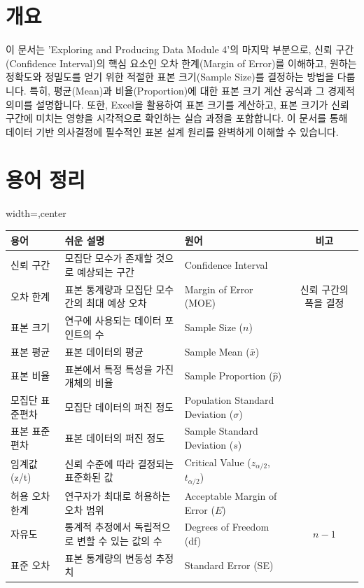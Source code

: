 \documentclass[11pt,a4paper]{book}
\theoremstyle{definition}
\begin{document}
\begin{enumerate}
\begin{enumerate}
\section{개요}
이 문서는 'Exploring and Producing Data Module 4'의 마지막 부분으로, 신뢰 구간(Confidence Interval)의 핵심 요소인 오차 한계(Margin of Error)를 이해하고, 원하는 정확도와 정밀도를 얻기 위한 적절한 표본 크기(Sample Size)를 결정하는 방법을 다룹니다. 특히, 평균(Mean)과 비율(Proportion)에 대한 표본 크기 계산 공식과 그 경제적 의미를 설명합니다. 또한, Excel을 활용하여 표본 크기를 계산하고, 표본 크기가 신뢰 구간에 미치는 영향을 시각적으로 확인하는 실습 과정을 포함합니다. 이 문서를 통해 데이터 기반 의사결정에 필수적인 표본 설계 원리를 완벽하게 이해할 수 있습니다.


\section{용어 정리}

\begin{adjustbox}{width=\textwidth,center}
\begin{tabular}{lllc}
\toprule
\textbf{용어} & \textbf{쉬운 설명} & \textbf{원어} & \textbf{비고} \\
\midrule
신뢰 구간 & 모집단 모수가 존재할 것으로 예상되는 구간 & Confidence Interval & \\
오차 한계 & 표본 통계량과 모집단 모수 간의 최대 예상 오차 & Margin of Error (MOE) & 신뢰 구간의 폭을 결정 \\
표본 크기 & 연구에 사용되는 데이터 포인트의 수 & Sample Size (\(n\)) & \\
표본 평균 & 표본 데이터의 평균 & Sample Mean (\(\bar{x}\)) & \\
표본 비율 & 표본에서 특정 특성을 가진 개체의 비율 & Sample Proportion (\(\hat{p}\)) & \\
모집단 표준편차 & 모집단 데이터의 퍼진 정도 & Population Standard Deviation (\(\sigma\)) & \\
표본 표준편차 & 표본 데이터의 퍼진 정도 & Sample Standard Deviation (\(s\)) & \\
임계값 (z/t) & 신뢰 수준에 따라 결정되는 표준화된 값 & Critical Value (\(z_{\alpha/2}\), \(t_{\alpha/2}\)) & \\
허용 오차 한계 & 연구자가 최대로 허용하는 오차 범위 & Acceptable Margin of Error (\(E\)) & \\
자유도 & 통계적 추정에서 독립적으로 변할 수 있는 값의 수 & Degrees of Freedom (df) & \(n-1\) \\
표준 오차 & 표본 통계량의 변동성 추정치 & Standard Error (SE) & \\
\bottomrule
\end{tabular}
\end{adjustbox}


\end{enumerate}
\end{enumerate}
\end{document}
